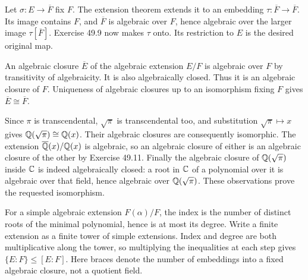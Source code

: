 Let $\sigma:E\to\overline F$ fix $F$. The extension theorem extends it to an embedding $\tau:\overline F\to\overline F$. Its image contains $F$, and $\overline F$ is algebraic over $F$, hence algebraic over the larger image $\tau[\overline F]$. Exercise 49.9 now makes $\tau$ onto. Its restriction to $E$ is the desired original map.

An algebraic closure $\overline E$ of the algebraic extension $E/F$ is algebraic over $F$ by transitivity of algebraicity. It is also algebraically closed. Thus it is an algebraic closure of $F$. Uniqueness of algebraic closures up to an isomorphism fixing $F$ gives $\overline E\cong\overline F$.

Since $\pi$ is transcendental, $\sqrt\pi$ is transcendental too, and substitution $\sqrt\pi\mapsto x$ gives $\mathbb{Q}(\sqrt\pi)\cong\mathbb{Q}(x)$. Their algebraic closures are consequently isomorphic. The extension $\overline{\mathbb{Q}}(x)/\mathbb{Q}(x)$ is algebraic, so an algebraic closure of either is an algebraic closure of the other by Exercise 49.11. Finally the algebraic closure of $\mathbb{Q}(\sqrt\pi)$ inside $\mathbb{C}$ is indeed algebraically closed: a root in $\mathbb{C}$ of a polynomial over it is algebraic over that field, hence algebraic over $\mathbb{Q}(\sqrt\pi)$. These observations prove the requested isomorphism.

For a simple algebraic extension $F(\alpha)/F$, the index is the number of distinct roots of the minimal polynomial, hence is at most its degree. Write a finite extension as a finite tower of simple extensions. Index and degree are both multiplicative along the tower, so multiplying the inequalities at each step gives $\{E:F\}\le[E:F]$. Here braces denote the number of embeddings into a fixed algebraic closure, not a quotient field.

